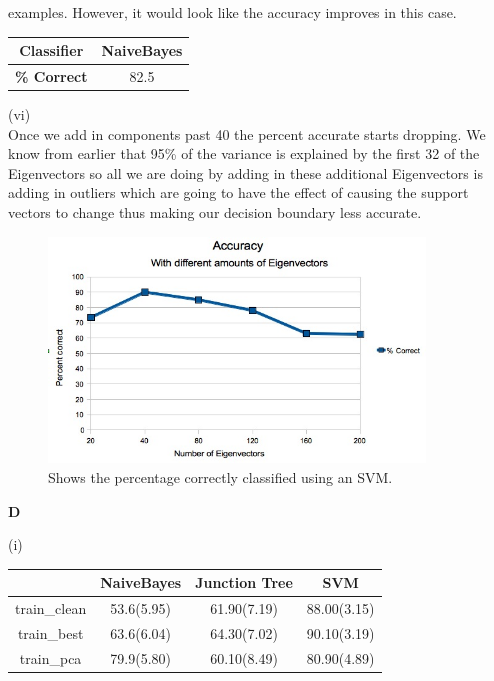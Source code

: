 \documentclass{report}
\begin{document}
examples. However, it would look like the accuracy improves in this
case.\\
\begin{center}
  \begin{tabular}{|c|c|}
    \hline
    {\bf Classifier} & {\bf NaiveBayes}\\
    \hline
    {\bf \% Correct} & 82.5\\
    \hline
  \end{tabular}
\end{center}
(vi)\\
Once we add in components past 40 the percent accurate starts
dropping. We know from earlier that 95\% of the variance is explained
by the first 32 of the Eigenvectors so all we are doing by adding in
these additional Eigenvectors is adding in outliers which are going to
have the effect of causing the support vectors to change thus making
our decision boundary less accurate.\\
\begin{figure}[h]
  \centering
  \includegraphics[height=60mm]{images/Cviplot.jpg}
  \caption{Shows the percentage correctly classified using an SVM.}
  \label{fig}
\end{figure}
\begin{center}{\bf D}\end{center}
(i)\\
\begin{center}
  \begin{tabular}{|c|c|c|c|}
    \hline
    & {\bf NaiveBayes} & {\bf Junction Tree} & {\bf SVM}\\
    \hline
    train\_clean & 53.6(5.95) & 61.90(7.19) & 88.00(3.15)\\
    \hline
    train\_best & 63.6(6.04) & 64.30(7.02) & 90.10(3.19)\\
    \hline
    train\_pca & 79.9(5.80) & 60.10(8.49) & 80.90(4.89)\\
    \hline
  \end{tabular}
\end{center}
\end{document}
